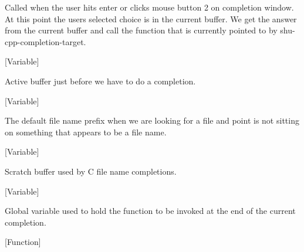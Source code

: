 \begin{doc-string}
Called when the user hits enter or clicks mouse button 2 on completion window.
At this point the users selected choice is in the current buffer.  We get the
answer from the current buffer and call the function that is currently
pointed to by shu-cpp-completion-target.
\end{doc-string}

\vspace{1em}
\noindent
{}
\usebox{\funcname}
 \hfill [Variable]

\begin{doc-string}
Active buffer just before we have to do a completion.
\end{doc-string}

\vspace{1em}
\noindent
{}
\usebox{\funcname}
 \hfill [Variable]

\begin{doc-string}
The default file name prefix when we are looking for a file and point is not
sitting on something that appears to be a file name.
\end{doc-string}

\vspace{1em}
\noindent
{}
\usebox{\funcname}
 \hfill [Variable]

\begin{doc-string}
Scratch buffer used by C file name completions.
\end{doc-string}

\vspace{1em}
\noindent
{}
\usebox{\funcname}
 \hfill [Variable]

\begin{doc-string}
Global variable used to hold the function to be invoked at the end of the
current completion.
\end{doc-string}

\vspace{1em}
\noindent
{}
\usebox{\funcname}
 \hfill [Function]

